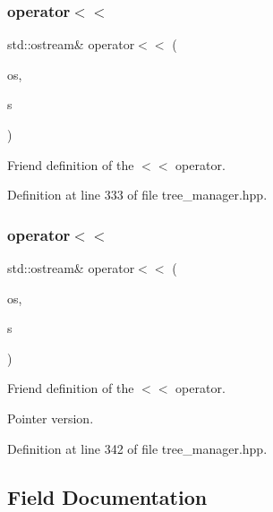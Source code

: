 \subsubsection{\texorpdfstring{operator$<$$<$}{operator<<}\hspace{0.1cm}{\footnotesize\ttfamily [1/2]}}
{\footnotesize\ttfamily std\+::ostream\& operator$<$$<$ (\begin{DoxyParamCaption}\item[{std\+::ostream \&}]{os,  }\item[{\hyperlink{classtree__manager}{tree\+\_\+manager} \&}]{s }\end{DoxyParamCaption})\hspace{0.3cm}{\ttfamily [friend]}}



Friend definition of the $<$$<$ operator. 



Definition at line 333 of file tree\+\_\+manager.\+hpp.

\mbox{\label{classtree__manager_aca200eafe7978efae4b3fe91fb2c3751}} 
\subsubsection{\texorpdfstring{operator$<$$<$}{operator<<}\hspace{0.1cm}{\footnotesize\ttfamily [2/2]}}
{\footnotesize\ttfamily std\+::ostream\& operator$<$$<$ (\begin{DoxyParamCaption}\item[{std\+::ostream \&}]{os,  }\item[{const \hyperlink{tree__manager_8hpp_a96ff150c071ce11a9a7a1e40590f205e}{tree\+\_\+manager\+Ref} \&}]{s }\end{DoxyParamCaption})\hspace{0.3cm}{\ttfamily [friend]}}



Friend definition of the $<$$<$ operator. 

Pointer version. 

Definition at line 342 of file tree\+\_\+manager.\+hpp.



\subsection{Field Documentation}
\mbox{\label{classtree__manager_a6e4b6318437f763fc451a2773b4adf41}} 
